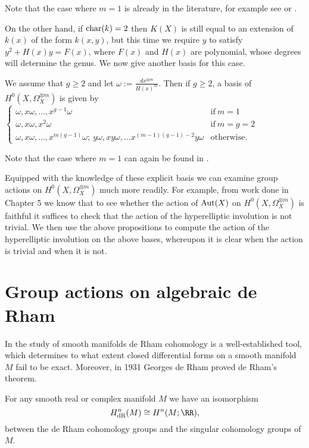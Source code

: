 Note that the case where $m=1$ is already in the literature, for example see \cite[Prop. 7.4.26]{liu} or \cite[Ch. IV, \S 4, Prop. 4.3]{griffiths}.
 
On the other hand, if $\operatorname{char}(k) = 2$ then $K(X)$ is still equal to an extension of $k(x)$ of the form $k(x,y)$, but this time we require $y$ to satisfy $y^2 + H(x)y = F(x)$, where $F(x)$ and $H(x)$ are polynomial, whose degrees will determine the genus.
We now give another basis for this case.
    \begin{prop}\label{propbasishyperellipticp=2}
    We assume that $g\geq 2$ and let $\omega:= \frac{dx^{\otimes m}}{H(x)^m}$. 
    Then if $g\geq 2$, a basis of $H^0(X,\Omega_X^{\otimes m})$ is given by
        $\begin{cases}
        \omega, x\omega, \ldots , x^{g-1}\omega &  \mbox{if}\ m=1 \\
        \omega, x\omega, x^2\omega & \mbox{if}\ m=g=2 \\
        \omega, x\omega, \ldots, x^{m(g-1)}\omega;\  y\omega, xy\omega, \ldots x^{(m-1)(g-1)-2}y\omega & \mbox{otherwise.}
        \end{cases}$
    \end{prop}
    
Note that the case where $m=1$ can again be found in \cite[Prop. 7.4.26]{liu}.

Equipped with the knowledge of these explicit basis we can examine group actions on $H^0(X,\Omega_X^{\otimes m})$ much more readily.
For example, from work done in Chapter 5 we know that to see whether the action of $\operatorname{Aut}(X)$ on $H^0(X,\Omega_X^{\otimes m})$ is faithful it suffices to check that the action of the hyperelliptic involution is not trivial.
We then use the above propositions to compute the action of the hyperelliptic involution on the above bases, whereupon it is clear when the action is trivial and when it is not.

\section{Group actions on algebraic de Rham}

In the study of smooth manifolds de Rham cohomology is a well-established tool, which determines to what extent closed differential forms on a smooth manifold $M$ fail to be exact.
Moreover, in 1931 Georges de Rham  proved de Rham's theorem.
    \begin{unnumthm}
    For any smooth real or complex manifold $M$ we have an isomorphism
        \[
        H^n_{\text{dR}}(M) \cong H^n(M;\RR),
        \]
    between the de Rham cohomology groups and the singular cohomology groups of $M$.
    \end{unnumthm}

